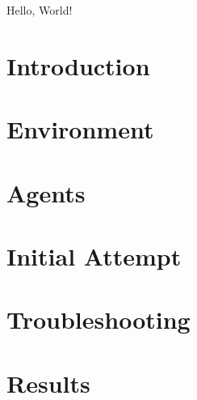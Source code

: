 \documentclass[11pt]{article}
\begin{document}
    Hello, World!

    \section{Introduction}\label{sec:introduction}
    

    \section{Environment}\label{sec:environment}
    


    \section{Agents}\label{sec:agents}
    


    \section{Initial Attempt}\label{sec:initital_attempt}
    


    \section{Troubleshooting}\label{sec:troubleshooting}
    


    \section{Results}\label{sec:results}
    
\end{document}
